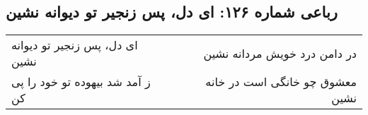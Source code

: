 \begin{center}
\section*{رباعی شماره ۱۲۶: ای دل، پس زنجیر تو دیوانه نشین}
\label{sec:126}
\begin{longtable}{l p{0.5cm} r}
ای دل، پس زنجیر تو دیوانه نشین
&&
در دامن درد خویش مردانه نشین
\\
ز آمد شد بیهوده تو خود را پی کن
&&
معشوق چو خانگی است در خانه نشین
\\
\end{longtable}
\end{center}
